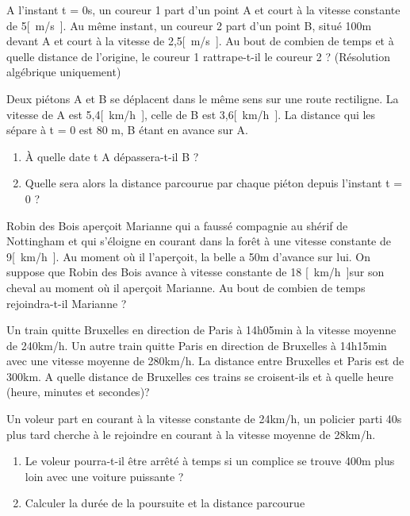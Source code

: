 \begin{exercise}
    A l'instant t = 0s, un coureur 1 part d'un point A et court à la vitesse constante de 5\unit{[m/s]}. Au même instant, un coureur 2 part d'un point B, situé 100m devant A et court à la vitesse de 2,5\unit{[m/s]}.
    Au bout de combien de temps et à quelle distance de l'origine, le coureur 1 rattrape-t-il le coureur 2 ? (Résolution algébrique uniquement)
\end{exercise}

\begin{exercise}
    Deux piétons A et B se déplacent dans le même sens sur une route rectiligne. La vitesse de A est 5,4\unit{[km/h]}, celle de B est 3,6\unit{[km/h]}. La distance qui les sépare à t = 0 est 80 m, B étant en avance sur A.
    \begin{enumerate}[label=\alph*)]
        \item À quelle date t A dépassera-t-il B ?
        \item Quelle sera alors la distance parcourue par chaque piéton depuis l'instant t = 0 ?
    \end{enumerate}
\end{exercise}

\begin{exercise}
    Robin des Bois aperçoit Marianne qui a faussé compagnie au shérif de Nottingham et qui s'éloigne en courant dans la forêt à une vitesse constante de 9\unit{[km/h]}. Au moment où il l'aperçoit, la belle a 50m d'avance sur lui. On suppose que Robin des Bois avance à vitesse constante de 18 \unit{[km/h]}sur son cheval au moment où il aperçoit Marianne. Au bout de combien de temps rejoindra-t-il Marianne ?
\end{exercise}

\begin{exercise}
    Un train quitte Bruxelles en direction de Paris à 14h05min à la vitesse moyenne de 240km/h. Un autre train quitte Paris en direction de Bruxelles à 14h15min avec une vitesse moyenne de 280km/h. La distance entre Bruxelles et Paris est de 300km. A quelle distance de Bruxelles ces trains se croisent-ils et à quelle heure (heure, minutes et secondes)?
\end{exercise}

\begin{exercise}
    Un voleur part en courant à la vitesse constante de 24km/h, un policier parti 40s plus tard cherche à le rejoindre en courant à la vitesse moyenne de 28km/h.
    \begin{enumerate}[label=\alph*)]
        \item Le voleur pourra-t-il être arrêté à temps si un complice se trouve 400m plus loin avec une voiture puissante ?
        \item Calculer la durée de la poursuite et la distance parcourue
    \end{enumerate}
\end{exercise}

